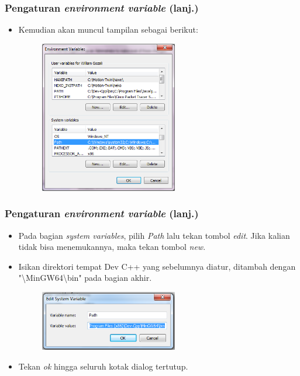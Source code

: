\begin{frame}
\frametitle{Pengaturan \textit{environment variable} (lanj.)}
\begin{itemize}
  \item Kemudian akan muncul tampilan sebagai berikut:
  \begin{figure}
    \includegraphics[width=6cm]{asset/path_3.PNG}
  \end{figure}
\end{itemize}
\end{frame}

\begin{frame}
\frametitle{Pengaturan \textit{environment variable} (lanj.)}
\begin{itemize}
  \item Pada bagian \textit{system variables}, pilih \textit{Path} lalu tekan tombol \textit{edit}. Jika kalian tidak bisa menemukannya, maka tekan tombol \textit{new}.
  \item Isikan direktori tempat Dev C++ yang sebelumnya diatur, ditambah dengan "\textbackslash MinGW64\textbackslash bin" pada bagian akhir.
  \begin{figure}
    \includegraphics[width=6cm]{asset/cpp-compile-2.png}
  \end{figure}
  \item Tekan \textit{ok} hingga seluruh kotak dialog tertutup.
\end{itemize}
\end{frame}

